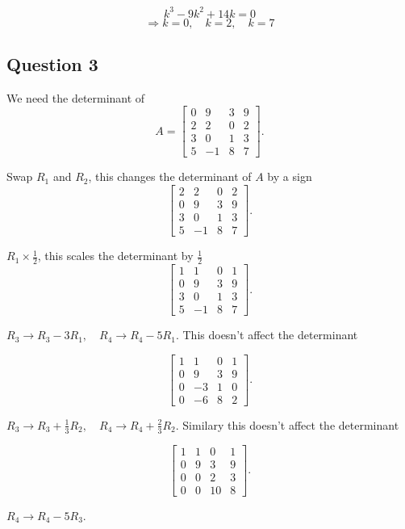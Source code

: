 \documentclass{article}
\begin{document}
\[
k^3 -9k^2 + 14k = 0 
\]
\[
\Rightarrow k = 0, \quad k = 2, \quad k = 7
\]



\subsection*{Question 3}
We need the determinant of
\[
A =
\begin{bmatrix}
0 & 9 & 3 & 9 \\
2 & 2 & 0 & 2 \\
3 & 0 & 1 & 3 \\
5 & -1 & 8 & 7
\end{bmatrix}.
\]

Swap $R_1$ and $R_2$, this changes the determinant of \(A\) by a sign
\[
\begin{bmatrix}
2 & 2 & 0 & 2 \\
0 & 9 & 3 & 9 \\
3 & 0 & 1 & 3 \\
5 & -1 & 8 & 7
\end{bmatrix}.
\]

\(R_1 \times \frac{1}{2}\), this scales the determinant by \(\frac{1}{2}\)
\[
\begin{bmatrix}
1 & 1 & 0 & 1 \\
0 & 9 & 3 & 9 \\
3 & 0 & 1 & 3 \\
5 & -1 & 8 & 7
\end{bmatrix}.
\]

\(
R_3 \to R_3 - 3R_1, \quad
R_4 \to R_4 - 5R_1.
\) This doesn't affect the determinant

\[
\begin{bmatrix}
1 & 1 & 0 & 1 \\
0 & 9 & 3 & 9 \\
0 & -3 & 1 & 0 \\
0 & -6 & 8 & 2
\end{bmatrix}.
\]

\(
R_3 \to R_3 + \tfrac{1}{3} R_2, \quad
R_4 \to R_4 + \tfrac{2}{3} R_2.
\) Similary this doesn't affect the determinant

\[
\begin{bmatrix}
1 & 1 & 0 & 1 \\
0 & 9 & 3 & 9 \\
0 & 0 & 2 & 3 \\
0 & 0 & 10 & 8
\end{bmatrix}.
\]

\(
R_4 \to R_4 - 5R_3.
\)
\end{document}

